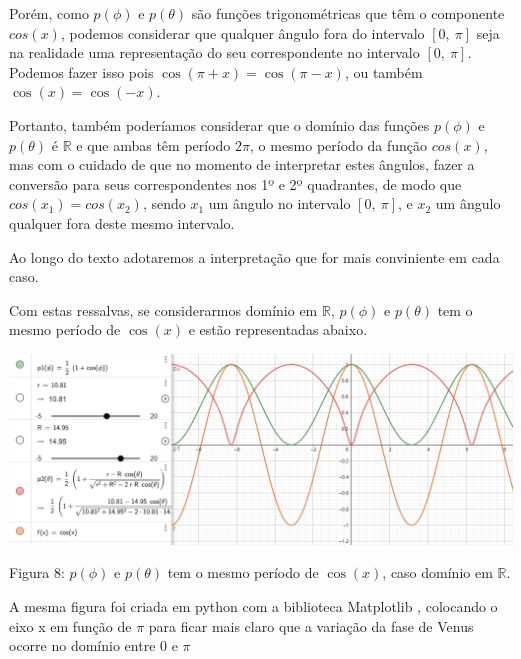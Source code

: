 \documentclass[a4paper, 12pt]{article}
\begin{document}
Porém, como $p\left(\phi \right)$ e $p\left(\theta \right)$ são funções trigonométricas que têm o componente $cos\left(x \right)$, podemos considerar que qualquer ângulo fora do intervalo $[0,\ \pi]$ seja na realidade uma representação do seu correspondente no intervalo $[0,\ \pi]$. Podemos fazer isso pois $\cos \left(\pi +x\right)=\cos \left(\pi -x\right)$, ou também $\cos \left(x\right)=\cos \left(-x\right)$.

Portanto, também poderíamos considerar que o domínio das funções $p\left(\phi \right)$ e $p\left(\theta \right)$ é $\mathbb{R}$ e que ambas têm período $2\pi$, o mesmo período da função $cos\left(x \right)$, mas com o cuidado de que no momento de interpretar estes ângulos, fazer a conversão para seus correspondentes nos 1º e 2º quadrantes, de modo que $cos\left(x_1 \right)=cos\left(x_2 \right)$, sendo $x_1$ um ângulo no intervalo $[0,\ \pi]$, e $x_2$ um ângulo qualquer fora deste mesmo intervalo.

Ao longo do texto adotaremos a interpretação que for mais conviniente em cada caso.

Com estas ressalvas, se considerarmos domínio em $\mathbb{R}$, $p\left(\phi \right)$ e $p\left(\theta \right)$ tem o mesmo período de $\cos \left(x\right)$ e estão representadas abaixo.

\begin{center}
    \includegraphics[width=16cm]{08-funcoes-cosseno.PNG}
    
    Figura 8: $p\left(\phi \right)$ e $p\left(\theta \right)$ tem o mesmo período de $\cos \left(x\right)$, caso domínio em $\mathbb{R}$.
\end{center}

A mesma figura foi criada em python com a biblioteca Matplotlib \citep{Biblioteca_Matplotlib}, colocando o eixo x em função de $\pi$ para ficar mais claro que a variação da fase de Venus ocorre no domínio entre 0 e $\pi$

\end{document}
